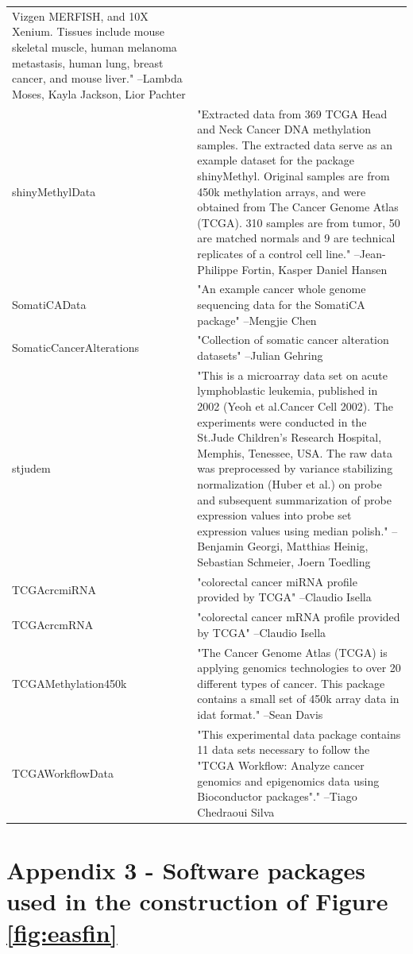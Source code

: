 \documentclass[]{article}
\begin{document}
\begin{longtable}[t]{l>{\raggedright\arraybackslash}p{25em}}
Vizgen MERFISH, and 10X Xenium. Tissues include mouse skeletal
muscle, human melanoma metastasis, human lung, breast cancer,
and mouse liver." --Lambda Moses, Kayla Jackson, Lior Pachter\\
\addlinespace
shinyMethylData & "Extracted data from 369 TCGA Head and Neck Cancer DNA
methylation samples. The extracted data serve as an example
dataset for the package shinyMethyl. Original samples are from
450k methylation arrays, and were obtained from The Cancer
Genome Atlas (TCGA). 310 samples are from tumor, 50 are matched
normals and 9 are technical replicates of a control cell line." --Jean-Philippe Fortin, Kasper Daniel Hansen\\
SomatiCAData & "An example cancer whole genome sequencing data for the
SomatiCA package" --Mengjie Chen\\
SomaticCancerAlterations & "Collection of somatic cancer alteration datasets" --Julian Gehring\\
stjudem & "This is a microarray data set on acute lymphoblastic
leukemia, published in 2002 (Yeoh et al.Cancer Cell 2002). The
experiments were conducted in the St.Jude Children's Research
Hospital, Memphis, Tenessee, USA. The raw data was preprocessed
by variance stabilizing normalization (Huber et al.) on probe
and subsequent summarization of probe expression values into
probe set expression values using median polish." --Benjamin Georgi, Matthias Heinig, Sebastian Schmeier, Joern Toedling\\
TCGAcrcmiRNA & "colorectal cancer miRNA profile provided by TCGA" --Claudio Isella\\
\addlinespace
TCGAcrcmRNA & "colorectal cancer mRNA profile provided by TCGA" --Claudio Isella\\
TCGAMethylation450k & "The Cancer Genome Atlas (TCGA) is applying genomics
technologies to over 20 different types of cancer.  This
package contains a small set of 450k array data in idat format." --Sean Davis\\
TCGAWorkflowData & "This experimental data package contains 11 data sets
necessary to follow the "TCGA Workflow: Analyze cancer genomics
and epigenomics data using Bioconductor packages"." --Tiago Chedraoui Silva\\
\bottomrule
\end{longtable}

\newpage

\hypertarget{app3}{%
\section{Appendix 3 - Software packages used in the construction of Figure \ref{fig:easfin}}\label{app3}}
\end{document}
